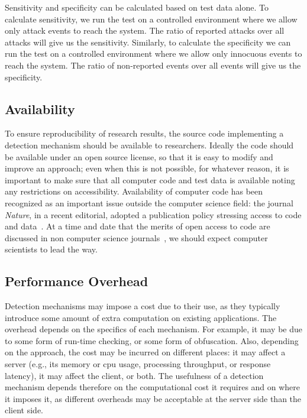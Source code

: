 \documentclass[conference]{IEEEtran}
\begin{document}
\noindent
Sensitivity and specificity can be calculated based on test
data alone. To calculate sensitivity, we run the test on a
controlled environment where we allow only attack events to reach the
system. The ratio of reported attacks over all attacks will give us
the sensitivity. Similarly, to calculate the specificity we can run
the test on a controlled environment where we allow only innocuous
events to reach the system. The ratio of non-reported events over all
events will give us the specificity. 

\subsection{Availability}

To ensure reproducibility of research results, the source code
implementing a detection mechanism should be available to researchers.
Ideally the code should be available under an open source license, so
that it is easy to modify and improve an approach; even when this is
not possible, for whatever reason, it is important to make sure that
all computer code and test data is available noting any restrictions
on accessibility. Availability of computer code has been recognized as
an important issue outside the computer science field: the journal
\emph{Nature}, in a recent editorial, adopted a publication policy stressing
access to code and data~\cite{nature2014}. At a time and date that the
merits of open access to code are discussed in non computer science
journals~\cite{easterbrook2014}, we should expect computer scientists
to lead the way.
 
\subsection{Performance Overhead}

Detection mechanisms may impose a cost due to their use, as they
typically introduce some amount of extra computation on existing applications.
The overhead depends on the specifics of each mechanism. For
example, it may be due to some form of run-time checking, or some form of
obfuscation. Also, depending on the approach, the cost may be incurred
on different places: it may affect a server
(e.g., its memory or {\sc cpu} usage, processing throughput, or response latency),
it may affect the client, or both. The
usefulness of a detection mechanism depends therefore on the
computational cost it requires and on where it imposes it, as
different overheads may be acceptable at the server side than the client side.
\end{document}
